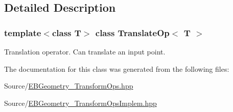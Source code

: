 \subsection{Detailed Description}
\subsubsection*{template$<$class T$>$\newline
class Translate\+Op$<$ T $>$}

Translation operator. Can translate an input point. 

The documentation for this class was generated from the following files\+:\begin{DoxyCompactItemize}
\item 
Source/\hyperlink{EBGeometry__TransformOps_8hpp}{E\+B\+Geometry\+\_\+\+Transform\+Ops.\+hpp}\item 
Source/\hyperlink{EBGeometry__TransformOpsImplem_8hpp}{E\+B\+Geometry\+\_\+\+Transform\+Ops\+Implem.\+hpp}\end{DoxyCompactItemize}
